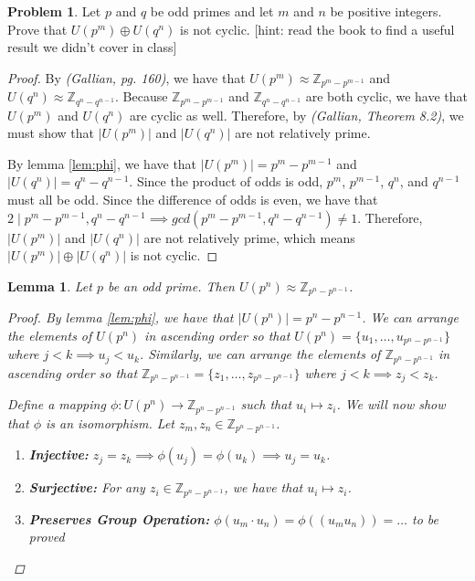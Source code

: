 \documentclass[12pt,reqno]{article}
\newcommand{\Z}{\mathbb{Z}}
\theoremstyle{plain}
\newtheorem{lemma}{Lemma}
\theoremstyle{definition}
\newtheorem{problem}{Problem}
\begin{document}
\newpage
    

\begin{problem} 
    Let $p$ and $q$ be odd primes and let $m$ and $n$ be positive integers. Prove that $U(p^m) \oplus U(q^n)$ is not cyclic. [hint: read the book to find a useful result we didn't cover in class]
\end{problem}

\begin{proof}
    By \emph{(Gallian, pg. 160)}, we have that \(U(p^m)\approx\Z_{p^m-p^{m-1}}\) and \(U(q^n)\approx\Z_{q^n-q^{n-1}}\). 
    Because \(\Z_{p^m-p^{m-1}}\) and \(\Z_{q^n-q^{n-1}}\) are both cyclic, we have that \(U(p^m)\) and \(U(q^n)\) are cyclic
    as well. Therefore, by \emph{(Gallian, Theorem 8.2)}, we must show that \(|U(p^m)|\) and \(|U(q^n)|\)
    are not relatively prime.

    By lemma \ref{lem:phi}, we have that \(|U(p^m)|=p^m-p^{m-1}\) and \(|U(q^n)|=q^n-q^{n-1}\). Since the product of odds is odd,
    \(p^m\), \(p^{m-1}\), \(q^n\), and \(q^{n-1}\) must all be odd. Since the difference of odds is even, we have that
    \(2\mid p^m-p^{m-1},q^n-q^{n-1}\implies gcd(p^m-p^{m-1},q^n-q^{n-1})\neq 1\). Therefore, \(|U(p^m)|\) and \(|U(q^n)|\) are not
    relatively prime, which means \(|U(p^m)|\oplus|U(q^n)|\) is not cyclic.
\end{proof}

\bigskip

\begin{lemma}
    \label{lem:iso}
    Let \(p\) be an odd prime. Then \(U(p^n)\approx \Z_{p^n-p^{n-1}}\).
    \begin{proof}
        By lemma \ref{lem:phi}, we have that \(|U(p^n)|=p^n-p^{n-1}\). We can arrange the elements of \(U(p^n)\) in ascending order
        so that \(U(p^n)=\{u_1,\ldots,u_{p^n-p^{n-1}}\}\) where \(j<k\implies u_j<u_k\). Similarly, we can arrange the
        elements of \(\Z_{p^n-p^{n-1}}\) in ascending order so that \(\Z_{p^n-p^{n-1}}=\{z_1,\ldots,z_{p^n-p^{n-1}}\}\) where
        \(j<k\implies z_j<z_k\).

        Define a mapping \(\phi: U(p^n)\to \Z_{p^n-p^{n-1}}\) such that \(u_i\mapsto z_i\). We will now show that
        \(\phi\) is an isomorphism. Let \(z_m,z_n\in\Z_{p^n-p^{n-1}}\).
        \begin{enumerate}
            \item \textbf{Injective:} \(z_j=z_k\implies \phi(u_j)=\phi(u_k)\implies u_j=u_k\).
            \item \textbf{Surjective:} For any \(z_i\in\Z_{p^n-p^{n-1}}\), we have that \(u_i\mapsto z_i\).
            \item \textbf{Preserves Group Operation:} \(\phi(u_m\cdot u_n)=\phi((u_mu_n))= \ldots\) to be proved
        \end{enumerate}
    \end{proof}
\end{lemma}
\end{document}
